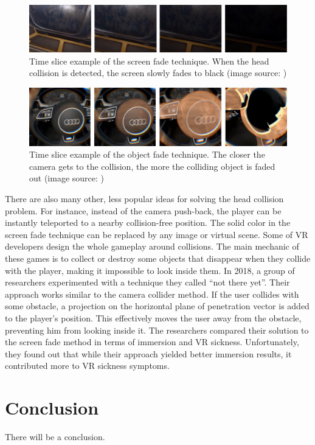 \begin{figure}[th]
\centering
\includegraphics[width=1\textwidth]{img/screen_fade.png}
\caption{Time slice example of the screen fade technique. When the head collision is detected, the screen slowly fades to black (image source: \cite{SCREENFADE})}
\label{fig:SCREENFADEIMAGE}
\end{figure}

\begin{figure}[th]
\centering
\includegraphics[width=1\textwidth]{img/object_fade.png}
\caption{Time slice example of the object fade technique. The closer the camera gets to the collision, the more the colliding object is faded out (image source: \cite{OBJECTFADE})}
\label{fig:OBJECTFADEIMAGE}
\end{figure}

There are also many other, less popular ideas for solving the head collision problem. For instance, instead of the camera push-back, the player can be instantly teleported to a nearby collision-free position. The solid color in the screen fade technique can be replaced by any image or virtual scene. Some of VR developers design the whole gameplay around collisions. The main mechanic of these games is to collect or destroy some objects that disappear when they collide with the player, making it impossible to look inside them. In 2018, a group of researchers \cite{COMPARISONCOLLISION} experimented with a technique they called ``not there yet''. Their approach works similar to the camera collider method. If the user collides with some obstacle, a projection on the horizontal plane of penetration vector is added to the player's position. This effectively moves the user away from the obstacle, preventing him from looking inside it. The researchers compared their solution to the screen fade method in terms of immersion and VR sickness. Unfortunately, they found out that while their approach yielded better immersion results, it contributed more to VR sickness symptoms.

\section{Conclusion}

There will be a conclusion.